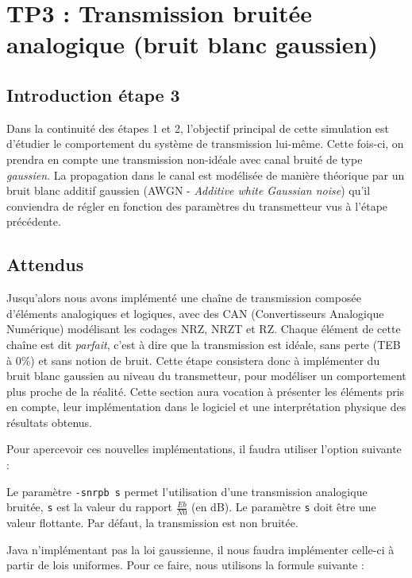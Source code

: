 \section{TP3 : Transmission bruitée analogique (bruit blanc gaussien)}

\subsection{Introduction étape 3}

Dans la continuité des étapes 1 et 2, l’objectif principal de cette simulation est d'étudier le comportement du système de transmission lui-même. Cette fois-ci, on prendra en compte une transmission non-idéale avec canal bruité de type \textit{gaussien}. La propagation dans le canal est modélisée de manière théorique par un bruit blanc additif gaussien (AWGN - \textit{Additive white Gaussian noise}) qu’il conviendra de régler en fonction des paramètres du transmetteur vus à l’étape précédente.  


\subsection{Attendus}

Jusqu'alors nous avons implémenté une chaîne de transmission composée d'éléments analogiques et logiques, avec des CAN (Convertisseurs Analogique Numérique) modélisant les codages NRZ, NRZT et RZ. Chaque élément de cette chaîne est dit \textit{parfait}, c'est à dire que la transmission est idéale, sans perte (TEB à 0\%) et sans notion de bruit. Cette étape consistera donc à implémenter du bruit blanc gaussien au niveau du transmetteur, pour modéliser un comportement plus proche de la réalité. Cette section aura vocation à présenter les éléments pris en compte, leur implémentation dans le logiciel et une interprétation physique des résultats obtenus.

Pour apercevoir ces nouvelles implémentations, il faudra utiliser l'option suivante :

Le paramètre \texttt{-snrpb s} permet l'utilisation d’une transmission analogique bruitée, \texttt{s} est la valeur du rapport $\frac{Eb}{N0}$ (en dB). Le paramètre \texttt{s} doit être une valeur flottante. Par défaut, la transmission est non bruitée.

Java n'implémentant pas la loi gaussienne, il nous faudra implémenter celle-ci à partir de lois uniformes. Pour ce faire, nous utilisons la formule suivante :

